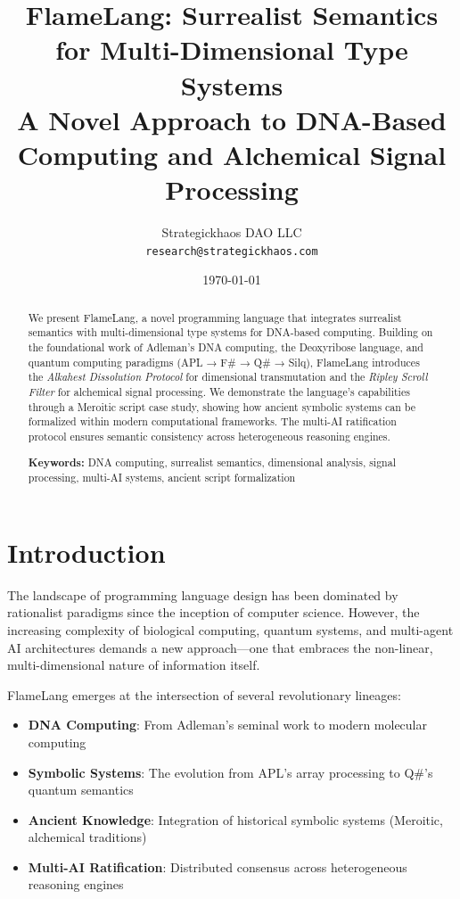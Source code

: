 \documentclass[11pt,a4paper]{article}
\title{FlameLang: Surrealist Semantics for Multi-Dimensional Type Systems\\
A Novel Approach to DNA-Based Computing and Alchemical Signal Processing}
\author{
Strategickhaos DAO LLC\\
\texttt{research@strategickhaos.com}
}
\date{\today}
\begin{document}
\maketitle

\begin{abstract}
We present FlameLang, a novel programming language that integrates surrealist semantics with multi-dimensional type systems for DNA-based computing. Building on the foundational work of Adleman's DNA computing, the Deoxyribose language, and quantum computing paradigms (APL → F\# → Q\# → Silq), FlameLang introduces the \textit{Alkahest Dissolution Protocol} for dimensional transmutation and the \textit{Ripley Scroll Filter} for alchemical signal processing. We demonstrate the language's capabilities through a Meroitic script case study, showing how ancient symbolic systems can be formalized within modern computational frameworks. The multi-AI ratification protocol ensures semantic consistency across heterogeneous reasoning engines.

\textbf{Keywords:} DNA computing, surrealist semantics, dimensional analysis, signal processing, multi-AI systems, ancient script formalization
\end{abstract}

\section{Introduction}

The landscape of programming language design has been dominated by rationalist paradigms since the inception of computer science. However, the increasing complexity of biological computing, quantum systems, and multi-agent AI architectures demands a new approach—one that embraces the non-linear, multi-dimensional nature of information itself.

FlameLang emerges at the intersection of several revolutionary lineages:

\begin{itemize}
\item \textbf{DNA Computing}: From Adleman's seminal work \cite{adleman1994} to modern molecular computing
\item \textbf{Symbolic Systems}: The evolution from APL's array processing to Q\#'s quantum semantics
\item \textbf{Ancient Knowledge}: Integration of historical symbolic systems (Meroitic, alchemical traditions)
\item \textbf{Multi-AI Ratification}: Distributed consensus across heterogeneous reasoning engines
\end{itemize}
\end{document}
